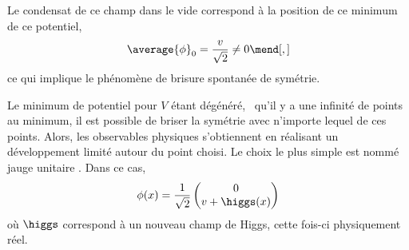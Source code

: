 \par Le condensat de ce champ dans le vide correspond à la position de ce minimum de ce potentiel,
\begin{equation}
\average{\phi}_0 = \frac{v}{\sqrt{2}} \neq 0
\mend[,]
\end{equation}
ce qui implique le phénomène de brisure spontanée de symétrie.
\par Le minimum de potentiel pour $V$ étant dégénéré, \ie\ qu'il y a une infinité de points au minimum, il est possible de briser la symétrie avec n'importe lequel de ces points. Alors, les observables physiques s'obtiennent en réalisant un développement limité autour du point choisi.
Le choix le plus simple est nommé \og jauge unitaire \fg.
Dans ce cas, %
\begin{equation}
\phi(x)
=
\frac{1}{\sqrt{2}}
\begin{pmatrix}
0 \\ v + \higgs(x)
\end{pmatrix}
\label{eq-phi_after_SSB}
\end{equation}
où $\higgs$ correspond à un nouveau champ de Higgs, cette fois-ci physiquement réel.%
